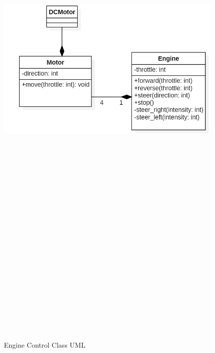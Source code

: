 \begin{figure}[ht]
    \label{fig:engine-class-uml}
    \includegraphics[width=15cm, height=30cm,keepaspectratio]{img/engine-class-uml.png}
    \caption{Engine Control Class UML}
\end{figure}


